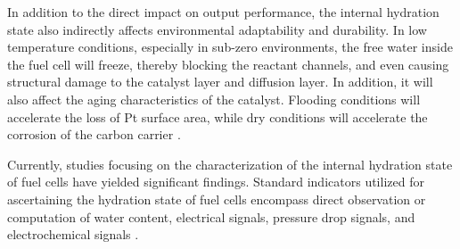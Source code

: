 \par
In addition to the direct impact on output performance, the internal hydration state also indirectly affects environmental adaptability and durability\cite{yuanModelbasedObserversInternal2020,fuFuelCellHumidity2021}. In low temperature conditions, especially in sub-zero environments, the free water inside the fuel cell will freeze, thereby blocking the reactant channels, and even causing structural damage to the catalyst layer and diffusion layer\cite{taccaniEffectFlowField2011,doddsHydrogenFuelCell2015}. In addition, it will also affect the aging characteristics of the catalyst\cite{pattersonDamageCathodeCatalyst2006,sunModelingInfluenceGDL2005}. Flooding conditions will accelerate the loss of Pt surface area, while dry conditions will accelerate the corrosion of the carbon carrier \cite{yousfisteinerDiagnosisPolymerElectrolyte2011,chenOperationCharacteristicsCarbon2015}. 
\par
Currently, studies focusing on the characterization of the internal hydration state of fuel cells have yielded significant findings. Standard indicators utilized for ascertaining the hydration state of fuel cells encompass direct observation or computation of water content, electrical signals, pressure drop signals, and electrochemical signals \cite{hussainiVisualizationQuantificationCathode2009}.
\par
